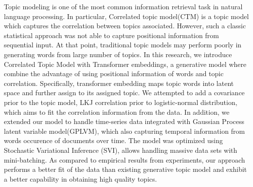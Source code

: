 Topic modeling is one of the most common information retrieval task in natural language processing. In particular, Correlated topic model(CTM) is a topic model which captures the correlation between topics associated. However, such a classic statistical approach was not able to capture positional information from sequential input. At that point, traditional topic models may perform poorly in generating words from large number of topics. 
In this research, we introduce Correlated Topic Model with Transformer embeddings, a generative model where combine the advantage of using positional information of words and topic correlation. Specifically, transformer embedding maps topic words into latent space and further assign to its assigned topic. 
We attempted to add a covariance prior to the topic model, LKJ correlation prior to logistic-normal distribution, which aims to fit the correlation information from the data. 
In addition, we extended our model to handle time-series data integrated with Gaussian Process latent variable model(GPLVM), which also capturing temporal information from words occurence of documents over time.
The model was optimized using Stochastic Variational Inference (SVI), allows handling massive data sets with mini-batching.
As compared to empirical results from experiments, our approach performs a better fit of the data than existing generative topic model and exhibit a better capability in obtaining high quality topics.